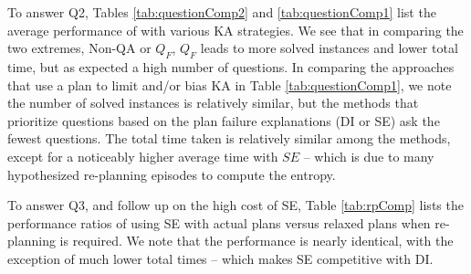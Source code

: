 \documentclass{article}
\begin{document}
To answer Q2, Tables \ref{tab:questionComp2} and \ref{tab:questionComp1} list
the average performance of  with various KA strategies.
We see that in comparing the two extremes, Non-QA or $Q_F$, $Q_F$ leads to more
solved instances and lower total time, but as expected a high number of
questions.  In comparing the approaches that use a plan to limit and/or bias
KA in Table \ref{tab:questionComp1}, we note the number of solved
instances is relatively similar, but the methods that prioritize questions based
on the plan failure explanations (DI or SE) ask the fewest questions.  The total
time taken is relatively similar among the methods, except for a noticeably higher average
time with $SE$ -- which is due to many hypothesized re-planning
episodes to compute the entropy.

To answer Q3, and follow up on the high cost of SE, Table \ref{tab:rpComp} lists
the performance ratios of using SE with actual plans versus relaxed plans when
re-planning is required.  We note that the performance is nearly identical, with
the exception of much lower total times -- which makes SE
competitive with DI.








\end{document}
